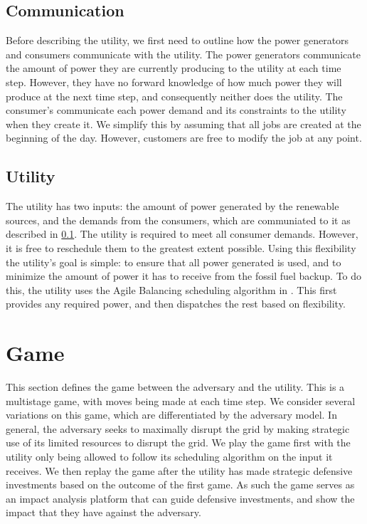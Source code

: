 \documentclass[conference]{IEEEtran}
\begin{document}
\subsection{Communication}
\label{Communication}

Before describing the utility, we first need to outline how the power generators and consumers communicate with the utility. The power generators communicate the amount of power they are currently producing to the utility at each time step. However, they have no forward knowledge of how much power they will produce at the next time step, and consequently neither does the utility. The consumer's communicate each power demand and its constraints to the utility when they create it. We simplify this by assuming that all jobs are created at the beginning of the day. However, customers are free to modify the job at any point.

\subsection{Utility}
\label{Utility}

The utility has two inputs: the amount of power generated by the renewable sources, and the demands from the consumers, which are communiated to it as described in \ref{Communication}. The utility is required to meet all consumer demands. However, it is free to reschedule them to the greatest extent possible. Using this flexibility the utility's goal is simple: to ensure that all power generated is used, and to minimize the amount of power it has to receive from the fossil fuel backup. To do this, the utility uses the Agile Balancing scheduling algorithm in \cite{petersen2013taxonomy}. This first provides any required power, and then dispatches the rest based on flexibility.

\section{Game}
\label{Game}

This section defines the game between the adversary and the utility. This is a multistage game, with moves being made at each time step. We consider several variations on this game, which are differentiated by the adversary model. In general, the adversary seeks to maximally disrupt the grid by making strategic use of its limited resources to disrupt the grid. We play the game first with the utility only being allowed to follow its scheduling algorithm on the input it receives. We then replay the game after the utility has made strategic defensive investments based on the outcome of the first game. As such the game serves as an impact analysis platform that can guide defensive investments, and show the impact that they have against the adversary.  
\end{document}
